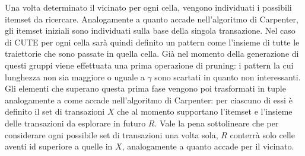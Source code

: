 Una volta determinato il vicinato per ogni cella, vengono individuati i possibili itemset da ricercare.
Analogamente a quanto accade nell'algoritmo di Carpenter, gli itemset iniziali sono individuati sulla base della singola transazione.
Nel caso di CUTE per ogni cella sarà quindi definito un pattern come l'insieme di tutte le traiettorie che sono passate in quella cella.
Già nel momento della generazione di questi gruppi viene effettuata una prima operazione di pruning: i pattern la cui lunghezza non sia maggiore o uguale a \(\gamma\) sono scartati in quanto non interessanti.
Gli elementi che superano questa prima fase vengono poi trasformati in tuple analogamente a come accade nell'algoritmo di Carpenter:
per ciascuno di essi è definito il set di transazioni \(X\) che al momento supportano l'itemset  e l'insieme delle transazioni da esplorare in futuro \(R\). 
Vale la pena sottolineare che per considerare ogni possibile set di transazioni una volta sola, \(R\) conterrà solo celle aventi id superiore a quelle in \(X\), analogamente a quanto accade per il vicinato.

